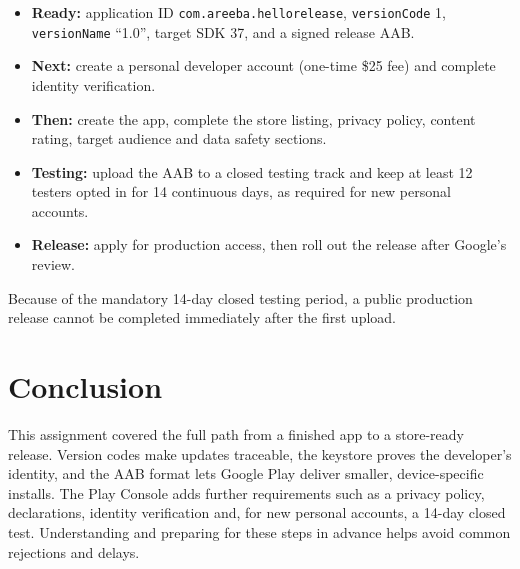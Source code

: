 \documentclass[11pt,letterpaper]{article}
\begin{document}
\begin{itemize}[leftmargin=2em,itemsep=2pt]
  \item \textbf{Ready:} application ID \texttt{com.areeba.hellorelease},
        \texttt{versionCode} 1, \texttt{versionName} ``1.0'', target SDK 37, and a
        signed release AAB.
  \item \textbf{Next:} create a personal developer account (one-time \$25 fee) and
        complete identity verification.
  \item \textbf{Then:} create the app, complete the store listing, privacy policy,
        content rating, target audience and data safety sections.
  \item \textbf{Testing:} upload the AAB to a closed testing track and keep at least
        12 testers opted in for 14 continuous days, as required for new personal
        accounts.
  \item \textbf{Release:} apply for production access, then roll out the release
        after Google's review.
\end{itemize}

Because of the mandatory 14-day closed testing period, a public production release
cannot be completed immediately after the first upload.

\section{Conclusion}

This assignment covered the full path from a finished app to a store-ready release.
Version codes make updates traceable, the keystore proves the developer's identity,
and the AAB format lets Google Play deliver smaller, device-specific installs. The
Play Console adds further requirements such as a privacy policy, declarations,
identity verification and, for new personal accounts, a 14-day closed test.
Understanding and preparing for these steps in advance helps avoid common rejections
and delays.
\end{document}
